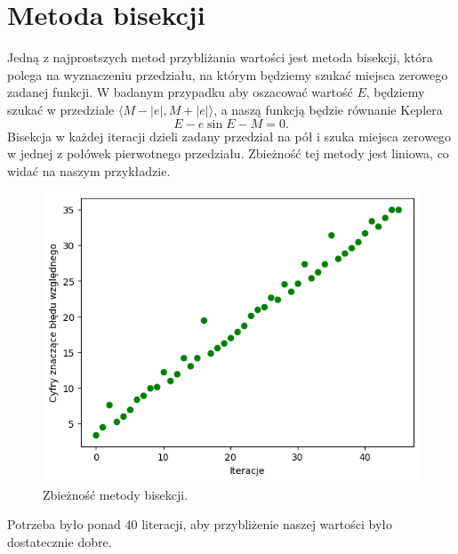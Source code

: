 \documentclass[11pt,wide]{mwart}
\begin{document}
\section{Metoda bisekcji} \label{Biskecja}
Jedną z najprostszych metod przybliżania wartości jest metoda bisekcji, która polega na wyznaczeniu przedziału, na którym będziemy szukać miejsca zerowego zadanej funkcji. W badanym przypadku aby oszacować wartość $E$, będziemy szukać w przedziale $\langle M - |e|, M + |e|\rangle$, a naszą funkcją będzie równanie Keplera
\begin{equation}
E - e \sin E - M = 0.
\end{equation}
Bisekcja w każdej iteracji dzieli zadany przedział na pół i szuka miejsca zerowego w jednej z połówek pierwotnego przedziału. Zbieżność tej metody jest liniowa, co widać na naszym przykładzie.  \\
\begin{figure}[H]
	\begin{center}
	\includegraphics[scale=0.6]{bisekcja}
	\end{center}
	\caption{Zbieżność metody bisekcji.}
\end{figure}
Potrzeba było ponad 40 literacji, aby przybliżenie naszej wartości było dostatecznie dobre.
\end{document}
